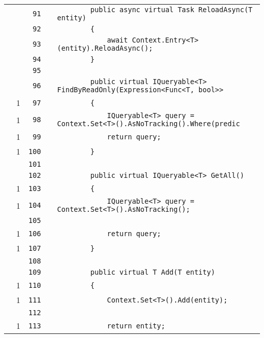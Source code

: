 \documentclass[a4paper,10pt]{article}
\begin{document}
\begin{longtable}[l]{lrrll}
\cellcolor{gray} &  & \verb~91~ & & \verb~        public async virtual Task ReloadAsync(T entity)~\\
\cellcolor{gray} &  & \verb~92~ & & \verb~        {~\\
\cellcolor{gray} &  & \verb~93~ & & \verb~            await Context.Entry<T>(entity).ReloadAsync();~\\
\cellcolor{gray} &  & \verb~94~ & & \verb~        }~\\
\cellcolor{gray} &  & \verb~95~ & & \verb~~\\
\cellcolor{gray} &  & \verb~96~ & & \verb~        public virtual IQueryable<T> FindByReadOnly(Expression<Func<T, bool>> ~\\
\cellcolor{green} & 1 & \verb~97~ & & \verb~        {~\\
\cellcolor{green} & 1 & \verb~98~ & & \verb~            IQueryable<T> query = Context.Set<T>().AsNoTracking().Where(predic~\\
\cellcolor{green} & 1 & \verb~99~ & & \verb~            return query;~\\
\cellcolor{green} & 1 & \verb~100~ & & \verb~        }~\\
\cellcolor{gray} &  & \verb~101~ & & \verb~~\\
\cellcolor{gray} &  & \verb~102~ & & \verb~        public virtual IQueryable<T> GetAll()~\\
\cellcolor{green} & 1 & \verb~103~ & & \verb~        {~\\
\cellcolor{green} & 1 & \verb~104~ & & \verb~            IQueryable<T> query = Context.Set<T>().AsNoTracking();~\\
\cellcolor{gray} &  & \verb~105~ & & \verb~~\\
\cellcolor{green} & 1 & \verb~106~ & & \verb~            return query;~\\
\cellcolor{green} & 1 & \verb~107~ & & \verb~        }~\\
\cellcolor{gray} &  & \verb~108~ & & \verb~~\\
\cellcolor{gray} &  & \verb~109~ & & \verb~        public virtual T Add(T entity)~\\
\cellcolor{green} & 1 & \verb~110~ & & \verb~        {~\\
\cellcolor{green} & 1 & \verb~111~ & & \verb~            Context.Set<T>().Add(entity);~\\
\cellcolor{gray} &  & \verb~112~ & & \verb~~\\
\cellcolor{green} & 1 & \verb~113~ & & \verb~            return entity;~\\

\end{longtable}
\end{document}
